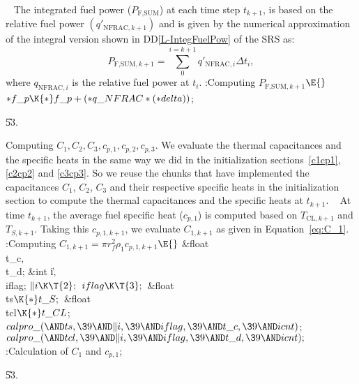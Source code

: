 \documentclass[letterpaper,12pt,baseclass=report]{cweb-hy}
\begin{document}
{
~\newline
The integrated fuel power ($P_{\text{F,SUM}}$) at each time step $t_{k+1}$,
is based on the relative fuel power $(q'_{\text{NFRAC},k+1})$ and is given
by the numerical approximation of the integral version shown in
DD\ref{L-IntegFuelPow} of the SRS as:
\begin{equation}
P_{\text{F,SUM},k+1}=\sum_{0}^{i=k+1} q'_{\text{NFRAC},i} \Delta t_i,
\end{equation}
where $q_{\text{NFRAC},i}$ is the relative fuel power at $t_i$.
\Y\B\4:Computing $P_{\text{F,SUM},k+1}$\X${}\E{}$\6
${*}\\{f\_p}\K{*}\\{f\_p}+({*}\\{q\_NFRAC}*({*}\\{delta})){}$;\par
\U53.\fi

\fi

Computing ${C_1, C_2, C_3, c_{p,1}, c_{p,2}, c_{p,3}}$.
We evaluate the thermal capacitances and the specific heats in the same way we
did
in the initialization sections~\ref{c1cp1},
\ref{c2cp2} and
\ref{c3cp3}. So we reuse the chunks that have implemented the capacitances
$C_1$,
$C_2$, $C_3$ and their respective specific heats in the initialization section
to
compute the thermal capacitances and the specific heats at $t_{k+1}$.
~\newline
At time $t_{k+1}$, the average fuel specific heat ($c_{p,1}$) is computed based
on
$T_{\text{CL},k+1}$ and $T_{S,k+1}$. Taking this $c_{p,1,k+1}$, we evaluate
$C_{1,k+1}$
as given in Equation~\ref{eq:C_1}.
\Y\B\4:Computing $C_{1,k+1} =\pi r_f^2 \rho_1 c_{p,1,k+1}$\X${}\E{}$\6
\&{float} \\{t\_c}${},{}$ \\{t\_d};\6
\&{int} \|i${},{}$ \\{iflag};\7
${}\|i\K\T{2};{}$\6
${}\\{iflag}\K\T{3};{}$\7
\&{float} \\{ts}${}\K{*}\\{t\_S};{}$\6
\&{float} \\{tcl}${}\K{*}\\{t\_CL}{}$;\7
${}\\{calpro\_}({\AND}\\{ts},\39{\AND}\|i,\39{\AND}\\{iflag},\39{\AND}\\{t\_c},%
\39{\AND}\\{icnt}){}$;\6
${}\\{calpro\_}({\AND}\\{tcl},\39{\AND}\|i,\39{\AND}\\{iflag},\39{\AND}\\{t%
\_d},\39{\AND}\\{icnt});{}$\6
:Calculation of $C_{1}$ and $c_{p,1}$\X;\par
\U53.\fi

}
\end{document}
